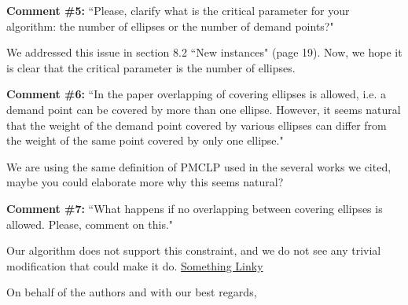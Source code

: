\documentclass[letterpaper]{letter}
\begin{document}
\begin{letter}{}
		\textbf{Comment \#5:} ``Please, clarify what is the critical parameter for your algorithm: the number of ellipses or the number of demand points?"
		
		We addressed this issue in section 8.2 ``New instances" (page 19). Now, we hope it is clear that the critical parameter is the number of ellipses.
		
		\textbf{Comment \#6:} ``In the paper overlapping of covering ellipses is allowed, i.e. a demand point can be covered by more than one ellipse. However, it seems natural that the weight of the demand point covered by various ellipses can differ from the weight of the same point covered by only one ellipse."
		
		We are using the same definition of PMCLP used in the several works we cited, maybe you could elaborate more why this seems natural?
		
		\textbf{Comment \#7:} ``What happens if no overlapping between covering ellipses is allowed. Please, comment on this."
		
		Our algorithm does not support this constraint, and we do not see any trivial modification that could make it do.
		\href{http://www.sharelatex.com}{Something Linky}
		
		\closing{On behalf of the authors and with our best regards,}
			\end{letter}
		
\end{document}
